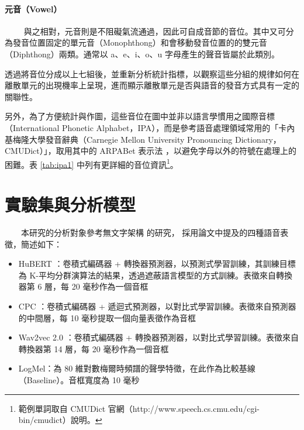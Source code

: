 \paragraph{元音（Vowel）} \hfill \break
　　
        與之相對，元音則是不阻礙氣流通過，因此可自成音節的音位。其中又可分為發音位置固定的單元音（Monophthong）和會移動發音位置的的雙元音（Diphthong）兩類。通常以 a、e、i、o、u 字母產生的聲音皆屬於此類別。
        
        透過將音位分成以上七組後，並重新分析統計指標，以觀察這些分組的規律如何在離散單元的出現機率上呈現，進而顯示離散單元是否與語音的發音方式具有一定的關聯性。

        另外，為了方便統計與作圖，這些音位在圖中並非以語言學慣用之國際音標（International Phonetic Alphabet，IPA）\cite{international1999handbook}，而是參考語音處理領域常用的「卡內基梅隆大學發音辭典（Carnegie Mellon University Pronouncing Dictionary，CMUDict）\cite{noauthor_cmu_nodate}」，取用其中的 ARPABet 表示法 \cite{klautau2001arpabet}，以避免字母以外的符號在處理上的困難。表 \ref{tab:ipa1} 中列有更詳細的音位資訊\footnote{範例單詞取自 CMUDict 官網（http://www.speech.cs.cmu.edu/cgi-bin/cmudict）說明。}。



\section{實驗集與分析模型}

　　本研究的分析對象參考無文字架構 \cite{noauthor_textless_2021, lakhotia_generative_2021, lakhotia_generative_2021-1} 的研究，
採用論文中提及的四種語音表徵，簡述如下：

\begin{itemize}
    \item HuBERT \cite{hsu_hubert_2021-2}：卷積式編碼器 + 轉換器預測器，以預測式學習訓練，其訓練目標為 K-平均分群演算法的結果，透過遮蔽語言模型的方式訓練。表徵來自轉換器第 6 層，每 20 毫秒作為一個音框
    \item CPC \cite{rivière2020unsupervised}：卷積式編碼器 + 遞迴式預測器，以對比式學習訓練。表徵來自預測器的中間層，每 10 毫秒提取一個向量表徵作為音框
    \item Wav2vec 2.0 \cite{baevski2020wav2vec}：卷積式編碼器 + 轉換器預測器，以對比式學習訓練。表徵來自轉換器第 14 層，每 20 毫秒作為一個音框
    \item LogMel：為 80 維對數梅爾時頻譜的聲學特徵，在此作為比較基線（Baseline）。音框寬度為 10 毫秒
\end{itemize}

